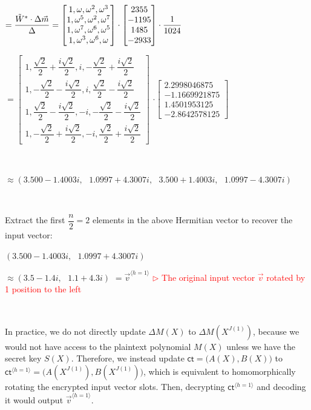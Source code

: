 $= \dfrac{\tilde W^* \cdot \Delta \vec{m}}{\Delta} = \begin{bmatrix}
1,\omega,\omega^2, \omega^3\\
1,\omega^5, \omega^{2},\omega^{7}\\
1,\omega^7, \omega^6, \omega^5\\
1,\omega^3, \omega^{6}, \omega
\end{bmatrix} \cdot \begin{bmatrix}
2355\\- 1195\\1485\\-2933
\end{bmatrix}\cdot \dfrac{1}{1024}$

$= 
\begin{bmatrix}
1,\dfrac{\sqrt{2}}{2} + \dfrac{i\sqrt{2}}{2},i, -\dfrac{\sqrt{2}}{2} + \dfrac{i\sqrt{2}}{2}\\
1,-\dfrac{\sqrt{2}}{2} - \dfrac{i\sqrt{2}}{2}, i,\dfrac{\sqrt{2}}{2} - \dfrac{i\sqrt{2}}{2}\\
1,\dfrac{\sqrt{2}}{2} - \dfrac{i\sqrt{2}}{2}, -i, -\dfrac{\sqrt{2}}{2} - \dfrac{i\sqrt{2}}{2}\\
1,-\dfrac{\sqrt{2}}{2} + \dfrac{i\sqrt{2}}{2}, -i, \dfrac{\sqrt{2}}{2} + \dfrac{i\sqrt{2}}{2}
\end{bmatrix}$
$\cdot \begin{bmatrix}
2.2998046875\\-1.1669921875\\1.4501953125\\-2.8642578125
\end{bmatrix}$

$ $

$ \approx (3.500 - 1.4003i, \text{ } 1.0997 + 4.3007i,\text{ } 3.500 + 1.4003i, \text{ } 1.0997 - 4.3007i)$

$ $

Extract the first $\dfrac{n}{2} = 2$ elements in the above Hermitian vector to recover the input vector:

$(3.500 - 1.4003i, \text{ } 1.0997 + 4.3007i)$

$ \approx (3.5 - 1.4i, \text{ } 1.1 + 4.3i)$
$ = \vec{v}^{\langle h=1 \rangle}$ \textcolor{red}{  $\rhd$ The original input vector $\vec{v}$ rotated by 1 position to the left}



$ $

In practice, we do not directly update $\Delta M(X)$ to $\Delta M(X^{J(1)})$, because we would not have access to the plaintext polynomial $M(X)$ unless we have the secret key $S(X)$. Therefore, we instead update $\textsf{ct}=\bm(A(X), B(X)\bm)$ to $\textsf{ct}^{\langle h=1 \rangle}=\bm(A(X^{J(1)}), B(X^{J(1)})\bm)$, which is equivalent to homomorphically rotating the encrypted input vector slots. Then, decrypting $\textsf{ct}^{\langle h=1 \rangle}$ and decoding it would output $\vec{v}^{\langle h=1 \rangle}$.

